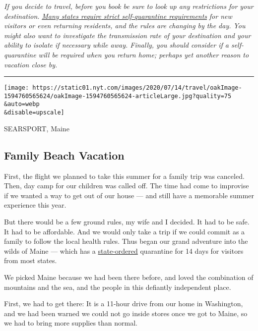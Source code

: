 \emph{If you decide to travel, before you book be sure to look up any
restrictions for your destination.}
\href{http://nytimes.com/2020/07/10/travel/state-travel-restrictions.html}{\emph{Many
states require strict self-quarantine requirements}} \emph{for new
visitors or even returning residents, and the rules are changing by the
day. You might also want to investigate the transmission rate of your
destination and your ability to isolate if necessary while away.
Finally, you should consider if a self-quarantine will be required when
you return home; perhaps yet another reason to vacation close by.}

\begin{center}\rule{0.5\linewidth}{\linethickness}\end{center}

\texttt{[image: https://static01.nyt.com/images/2020/07/14/travel/oakImage-1594760565624/oakImage-1594760565624-articleLarge.jpg?quality=75\\\&auto=webp\\\&disable=upscale]}

SEARSPORT, Maine

\hypertarget{family-beach-vacation}{%
\subsection{Family Beach Vacation}\label{family-beach-vacation}}

First, the flight we planned to take this summer for a family trip was
canceled. Then, day camp for our children was called off. The time had
come to improvise if we wanted a way to get out of our house --- and
still have a memorable summer experience this year.

But there would be a few ground rules, my wife and I decided. It had to
be safe. It had to be affordable. And we would only take a trip if we
could commit as a family to follow the local health rules. Thus began
our grand adventure into the wilds of Maine --- which has a
\href{https://www.maine.gov/governor/mills/sites/maine.gov.governor.mills/files/inline-files/An\%20Order\%20Establishing\%20Quarantine\%20Restrictions\%20On\%20Travelers\%20Arriving\%20in\%20Maine.pdf}{state-ordered}
quarantine for 14 days for visitors from most states.

We picked Maine because we had been there before, and loved the
combination of mountains and the sea, and the people in this defiantly
independent place.

First, we had to get there: It is a 11-hour drive from our home in
Washington, and we had been warned we could not go inside stores once we
got to Maine, so we had to bring more supplies than normal.

